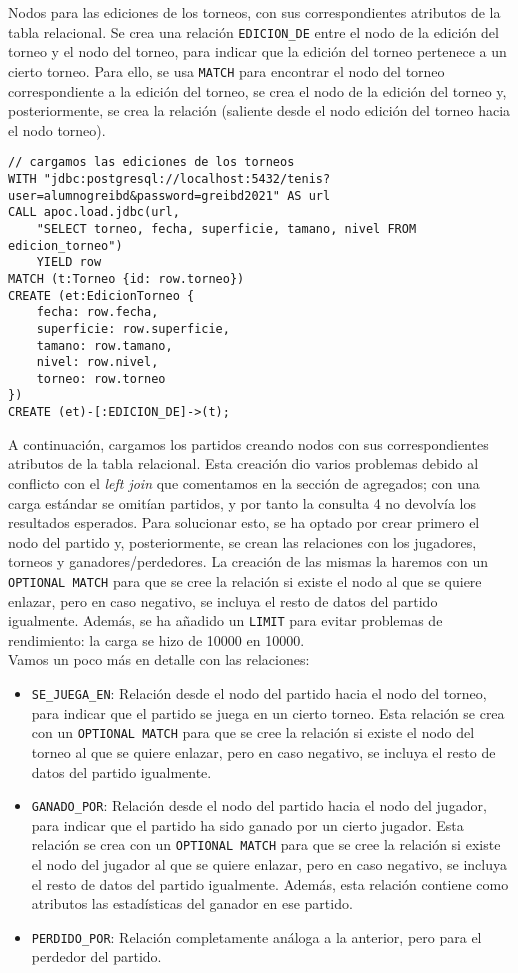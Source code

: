 Nodos para las ediciones de los torneos, con sus correspondientes atributos de la tabla relacional. Se crea una relación \texttt{EDICION\_DE} entre el nodo de la edición del torneo y el nodo del torneo, para indicar que la edición del torneo pertenece a un cierto torneo. Para ello, se usa \texttt{MATCH} para encontrar el nodo del torneo correspondiente a la edición del torneo, se crea el nodo de la edición del torneo y, posteriormente, se crea la relación (saliente desde el nodo edición del torneo hacia el nodo torneo).

\begin{verbatim}
// cargamos las ediciones de los torneos
WITH "jdbc:postgresql://localhost:5432/tenis?user=alumnogreibd&password=greibd2021" AS url
CALL apoc.load.jdbc(url, 
    "SELECT torneo, fecha, superficie, tamano, nivel FROM edicion_torneo") 
    YIELD row
MATCH (t:Torneo {id: row.torneo})
CREATE (et:EdicionTorneo {
    fecha: row.fecha,
    superficie: row.superficie,
    tamano: row.tamano,
    nivel: row.nivel,
    torneo: row.torneo
})
CREATE (et)-[:EDICION_DE]->(t);
\end{verbatim}

A continuación, cargamos los partidos creando nodos con sus correspondientes atributos de la tabla relacional. Esta creación dio varios problemas debido al conflicto con el \textit{left join} que comentamos en la sección de agregados; con una carga estándar se omitían partidos, y por tanto la consulta 4 no devolvía los resultados esperados. Para solucionar esto, se ha optado por crear primero el nodo del partido y, posteriormente, se crean las relaciones con los jugadores, torneos y ganadores/perdedores. La creación de las mismas la haremos con un \texttt{OPTIONAL MATCH} para que se cree la relación si existe el nodo al que se quiere enlazar, pero en caso negativo, se incluya el resto de datos del partido igualmente. Además, se ha añadido un \texttt{LIMIT} para evitar problemas de rendimiento: la carga se hizo de 10000 en 10000. \\

\noindent Vamos un poco más en detalle con las relaciones:
\begin{itemize}
\item \texttt{SE\_JUEGA\_EN}: Relación desde el nodo del partido hacia el nodo del torneo, para indicar que el partido se juega en un cierto torneo. Esta relación se crea con un \texttt{OPTIONAL MATCH} para que se cree la relación si existe el nodo del torneo al que se quiere enlazar, pero en caso negativo, se incluya el resto de datos del partido igualmente.
\item \texttt{GANADO\_POR}: Relación desde el nodo del partido hacia el nodo del jugador, para indicar que el partido ha sido ganado por un cierto jugador. Esta relación se crea con un \texttt{OPTIONAL MATCH} para que se cree la relación si existe el nodo del jugador al que se quiere enlazar, pero en caso negativo, se incluya el resto de datos del partido igualmente. Además, esta relación contiene como atributos las estadísticas del ganador en ese partido. 
\item \texttt{PERDIDO\_POR}: Relación completamente análoga a la anterior, pero para el perdedor del partido.
\end{itemize}

